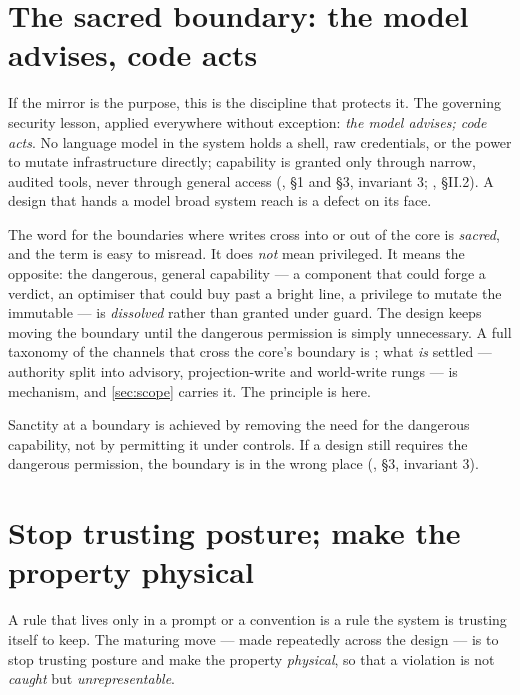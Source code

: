 \section{The sacred boundary: the model advises, code acts}
\label{sec:sacred}

If the mirror is the purpose, this is the discipline that protects it. The
governing security lesson, applied everywhere without exception: \emph{the model
advises; code acts}. No language model in the system holds a shell, raw
credentials, or the power to mutate infrastructure directly; capability is granted
only through narrow, audited tools, never through general access
(, \S 1 and \S 3, invariant 3;
, \S II.2). A design that hands a model broad
system reach is a defect on its face.

The word for the boundaries where writes cross into or out of the core is
\emph{sacred}, and the term is easy to misread. It does \emph{not} mean privileged.
It means the opposite: the dangerous, general capability --- a component that could
forge a verdict, an optimiser that could buy past a bright line, a privilege to
mutate the immutable --- is \emph{dissolved} rather than granted under guard. The
design keeps moving the boundary until the dangerous permission is simply
unnecessary. A full taxonomy of the channels that cross the core's boundary is
; what \emph{is} settled ---
authority split into advisory, projection-write and world-write rungs --- is
mechanism, and \autoref{sec:scope} carries it. The principle is here.

\begin{principle}
Sanctity at a boundary is achieved by removing the need for the dangerous
capability, not by permitting it under controls. If a design still requires the
dangerous permission, the boundary is in the wrong place
(, \S 3, invariant 3).
\end{principle}

\section{Stop trusting posture; make the property physical}
\label{sec:structural}

A rule that lives only in a prompt or a convention is a rule the system is trusting
itself to keep. The maturing move --- made repeatedly across the design --- is to
stop trusting posture and make the property \emph{physical}, so that a violation is
not \emph{caught} but \emph{unrepresentable}.

